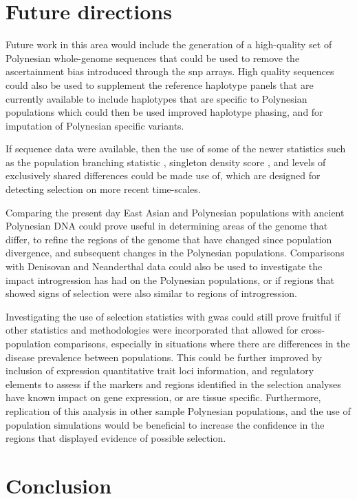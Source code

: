 \documentclass[]{report}
\begin{document}
\section{Future directions}\label{future-directions}

Future work in this area would include the generation of a high-quality
set of Polynesian whole-genome sequences that could be used to remove
the ascertainment bias introduced through the \gls{snp} arrays. High
quality sequences could also be used to supplement the reference
haplotype panels that are currently available to include haplotypes that
are specific to Polynesian populations which could then be used improved
haplotype phasing, and for imputation of Polynesian specific variants.

If sequence data were available, then the use of some of the newer
statistics such as the population branching statistic \citep{Yi2010b},
singleton density score \citep{Field2016}, and levels of exclusively
shared differences \citep{Librado2018} could be made use of, which are
designed for detecting selection on more recent time-scales.

Comparing the present day East Asian and Polynesian populations with
ancient Polynesian DNA could prove useful in determining areas of the
genome that differ, to refine the regions of the genome that have
changed since population divergence, and subsequent changes in the
Polynesian populations. Comparisons with Denisovan and Neanderthal data
could also be used to investigate the impact introgression has had on
the Polynesian populations, or if regions that showed signs of selection
were also similar to regions of introgression.

Investigating the use of selection statistics with \gls{gwas} could
still prove fruitful if other statistics and methodologies were
incorporated that allowed for cross-population comparisons, especially
in situations where there are differences in the disease prevalence
between populations. This could be further improved by inclusion of
expression quantitative trait loci information, and regulatory elements
to assess if the markers and regions identified in the selection
analyses have known impact on gene expression, or are tissue specific.
Furthermore, replication of this analysis in other sample Polynesian
populations, and the use of population simulations would be beneficial
to increase the confidence in the regions that displayed evidence of
possible selection.

\section{Conclusion}\label{conclusion-1}
\end{document}
